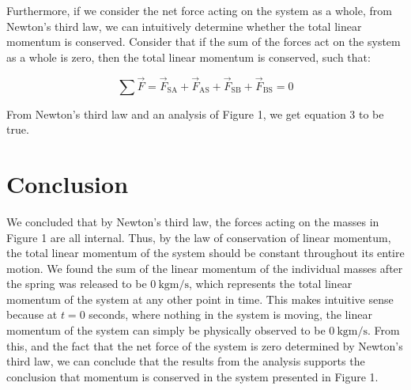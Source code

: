 \documentclass[12pt]{article}
\begin{document}
\newpage

Furthermore, if we consider the net force acting on the system as a whole, from Newton's third law, we can intuitively determine whether the total linear momentum is conserved. Consider that if the sum of the forces act on the system as a whole is zero, then the total linear momentum is conserved, such that:

\begin{equation}
    \sum{}{}\vec{F} = \vec{F}_\text{SA} + \vec{F}_\text{AS} + \vec{F}_\text{SB} + \vec{F}_\text{BS} = 0
\end{equation}

From Newton's third law and an analysis of Figure 1,  we get equation 3 to be true.

\section{Conclusion}
We concluded that by Newton's third law, the forces acting on the masses in Figure 1 are all internal. Thus, by the law of conservation of linear momentum, the total linear momentum of the system should be constant throughout its entire motion. We found the sum of the linear momentum of the individual masses after the spring was released to be $\SI{0}{\kilogram\metre\per\second}$, which represents the total linear momentum of the system at any other point in time. This makes intuitive sense because at $t = 0$ seconds, where nothing in the system is moving, the linear momentum of the system can simply be physically observed to be $\SI{0}{\kilogram\metre\per\second}$. From this, and the fact that the net force of the system is zero determined by Newton's third law, we can conclude that the results from the analysis supports the conclusion that momentum is conserved in the system presented in Figure 1.
\end{document}
